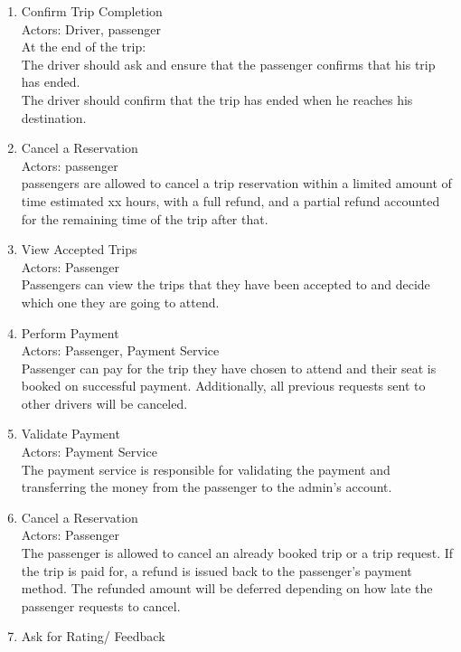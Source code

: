 \documentclass[a4paper, 12pt]{article} %
\begin{document}
\begin{enumerate}
                \item Confirm Trip Completion\\
                    Actors: Driver, passenger\\
                    At the end of the trip: \\
                        The driver should ask and ensure that the passenger confirms that his trip has ended. \\
                        The driver should confirm that the trip has ended when he reaches his destination.
                \item Cancel a Reservation\\
                    Actors: passenger\\
                    passengers are allowed to cancel a trip reservation within a limited amount of time estimated xx hours, with a full refund, and a partial refund accounted for the remaining time of the trip after that.
                \item View Accepted Trips\\
                    Actors: Passenger\\
                    Passengers can view the trips that they have been accepted to and decide which one they are going to attend.
                \item Perform Payment \\
                    Actors: Passenger, Payment Service \\
                    Passenger can pay for the trip they have chosen to attend and their seat is booked on successful payment. Additionally, all previous requests sent to other drivers will be canceled.
                \item Validate Payment \\
                    Actors: Payment Service \\
                    The payment service is responsible for validating the payment and transferring the money from the passenger to the admin’s account.
                \item Cancel a Reservation\\
                    Actors: Passenger \\
                    The passenger is allowed to cancel an already booked trip or a trip request. If the trip is paid for, a refund is issued back to the passenger’s payment method. The refunded amount will be deferred depending on how late the passenger requests to cancel.
                \item Ask for Rating/ Feedback\\

\end{enumerate}
\end{document}
